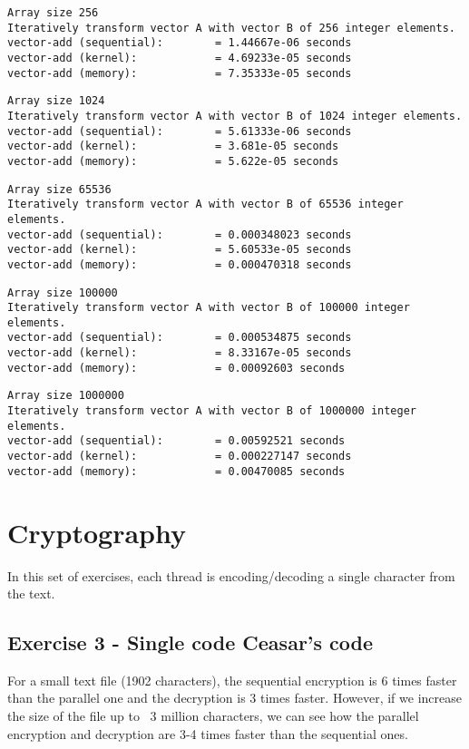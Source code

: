 \documentclass[a4paper]{article}
\begin{document}
\begin{verbatim}
Array size 256
Iteratively transform vector A with vector B of 256 integer elements.
vector-add (sequential):        = 1.44667e-06 seconds
vector-add (kernel):            = 4.69233e-05 seconds
vector-add (memory):            = 7.35333e-05 seconds
\end{verbatim}
\begin{verbatim}
Array size 1024
Iteratively transform vector A with vector B of 1024 integer elements.
vector-add (sequential):        = 5.61333e-06 seconds
vector-add (kernel):            = 3.681e-05 seconds
vector-add (memory):            = 5.622e-05 seconds
\end{verbatim}
\begin{verbatim}
Array size 65536
Iteratively transform vector A with vector B of 65536 integer elements.
vector-add (sequential):        = 0.000348023 seconds
vector-add (kernel):            = 5.60533e-05 seconds
vector-add (memory):            = 0.000470318 seconds
\end{verbatim}
\begin{verbatim}
Array size 100000
Iteratively transform vector A with vector B of 100000 integer elements.
vector-add (sequential):        = 0.000534875 seconds
vector-add (kernel):            = 8.33167e-05 seconds
vector-add (memory):            = 0.00092603 seconds
\end{verbatim}
\begin{verbatim}
Array size 1000000
Iteratively transform vector A with vector B of 1000000 integer elements.
vector-add (sequential):        = 0.00592521 seconds
vector-add (kernel):            = 0.000227147 seconds
vector-add (memory):            = 0.00470085 seconds
\end{verbatim}


\section{Cryptography}

In this set of exercises, each thread is encoding/decoding a single character from the text.

\subsection{Exercise 3 - Single code Ceasar's code}

For a small text file (1902 characters), the sequential encryption is 6 times faster than the parallel one and the decryption is 3 times faster. However, if we increase the size of the file up to ~3 million characters, we can see how the parallel encryption and decryption are 3-4 times faster than the sequential ones.
\end{document}
